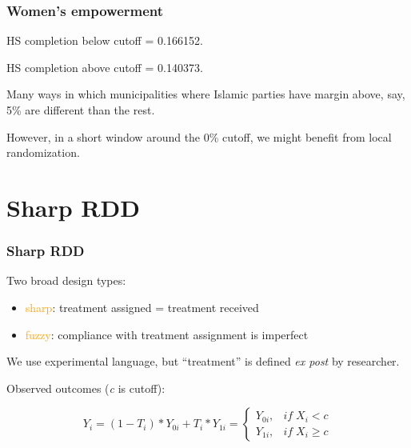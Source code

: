 \documentclass[12pt,english,dvipsnames,aspectratio=169,handout]{beamer}\usepackage[]{graphicx}\usepackage[]{xcolor}
\begin{document}
\begin{frame}
\frametitle{Women's empowerment}
HS completion below cutoff = 0.166152.

HS completion above cutoff = 0.140373.\bigskip
\pause

Many ways in which municipalities where Islamic parties have margin above, say, 5\% are different than the rest.\bigskip
\pause

However, in a short window around the 0\% cutoff, we might benefit from local randomization.

\end{frame}


\section{Sharp RDD}

\begin{frame}
\frametitle{Sharp RDD}
Two broad design types:

\begin{itemize}
\item \textcolor{orange}{sharp}: treatment assigned = treatment received
\item \textcolor{orange}{fuzzy}: compliance with treatment assignment is imperfect
\end{itemize}
\bigskip
\pause

We use experimental language, but ``treatment'' is defined \textit{ex post} by researcher.\bigskip
\pause

Observed outcomes (\textit{c} is cutoff):

\begin{equation}
Y_i = (1 - T_i)*Y_{0i} + T_i*Y_{1i} = \begin{cases}
Y_{0i}, & if\; X_i < c \\
Y_{1i}, & if\; X_i \geq c 
\end{cases}
\end{equation}

\end{frame}
\end{document}
